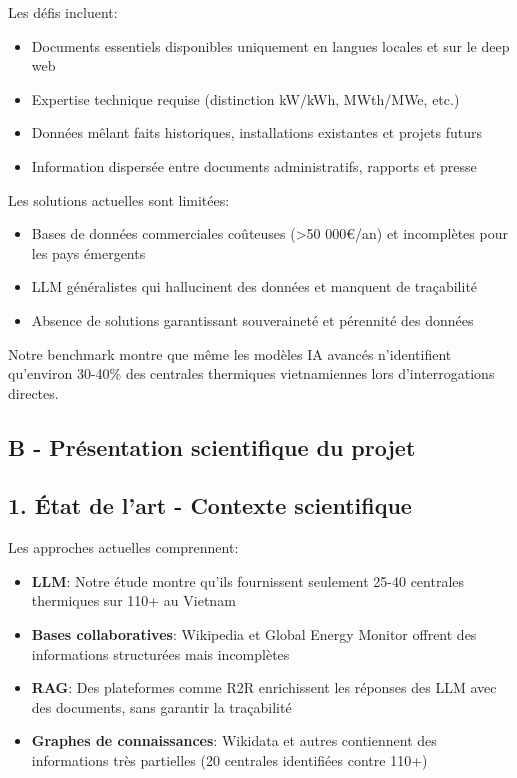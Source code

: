 \documentclass[a4paper,11pt]{report}
\providecommand{\tightlist}{\setlength{\itemsep}{0pt}\setlength{\parskip}{0pt}}
\begin{document}
Les défis incluent:

\begin{itemize}
\tightlist
\item
  Documents essentiels disponibles uniquement en langues locales et sur le deep web
\item
  Expertise technique requise (distinction kW/kWh, MWth/MWe, etc.)
\item
  Données mêlant faits historiques, installations existantes et projets futurs
\item
  Information dispersée entre documents administratifs, rapports et presse
\end{itemize}

Les solutions actuelles sont limitées:

\begin{itemize}
\tightlist
\item
  Bases de données commerciales coûteuses (\textgreater50 000€/an) et incomplètes pour les pays émergents
\item
  LLM généralistes qui hallucinent des données et manquent de traçabilité
\item
  Absence de solutions garantissant souveraineté et pérennité des données
\end{itemize}

Notre benchmark montre que même les modèles IA avancés n'identifient qu'environ 30-40\% des centrales thermiques vietnamiennes lors d'interrogations directes.

\subsection{B - Présentation scientifique du projet}\label{b---pruxe9sentation-scientifique-du-projet}

\subsection{1. État de l'art - Contexte scientifique}\label{uxe9tat-de-lart---contexte-scientifique}

Les approches actuelles comprennent:

\begin{itemize}
\tightlist
\item
  \textbf{LLM}: Notre étude montre qu'ils fournissent seulement 25-40 centrales thermiques sur 110+ au Vietnam
\item
  \textbf{Bases collaboratives}: Wikipedia et Global Energy Monitor offrent des informations structurées mais incomplètes
\item
  \textbf{RAG}: Des plateformes comme R2R enrichissent les réponses des LLM avec des documents, sans garantir la traçabilité
\item
  \textbf{Graphes de connaissances}: Wikidata et autres contiennent des informations très partielles (20 centrales identifiées contre 110+)
\end{itemize}
\end{document}
